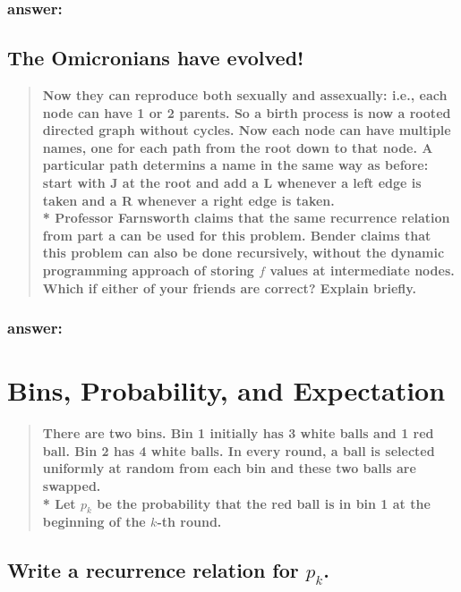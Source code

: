 \documentclass[titlepage]{article}\usepackage[]{graphicx}\usepackage[]{color}
\theoremstyle{definition}
\begin{document}
\subsubsection{answer:}
\vspace{5cm}



\subsection{The Omicronians have evolved!} 
\begin{quote}
  \textbf{Now they can reproduce both sexually
	and assexually: i.e., each node can have 1 or 2 parents. So a birth process
	is now a rooted directed graph without cycles. Now each node can have
	multiple names, one for each path from the root down to that node. A
	particular path determins a name in the same way as before: start with J at
	the root and add a L whenever a left edge is taken and a R whenever a right
	edge is taken. \\*
	Professor Farnsworth claims that the same recurrence relation from part a
	can be used for this problem. Bender claims that this problem can also be
	done recursively, without the dynamic programming approach of storing $f$
	values at intermediate nodes. Which if either of your friends are correct?
	Explain briefly.}
\end{quote}
\subsubsection{answer: }
\vspace{8cm}





\section{Bins, Probability, and Expectation}
\begin{quote}
  \textbf{There are two bins. Bin 1 initially has 3 white balls and 1 red ball.
  Bin 2 has 4 white balls. In every round, a ball is selected uniformly at
  random from each bin and these two balls are swapped. \\*
  Let $p_k$ be the probability that the red ball is in bin 1 at the beginning of
  the $k$-th round.}
\end{quote}

\subsection{ Write a recurrence relation for $p_k$. }
\end{document}
